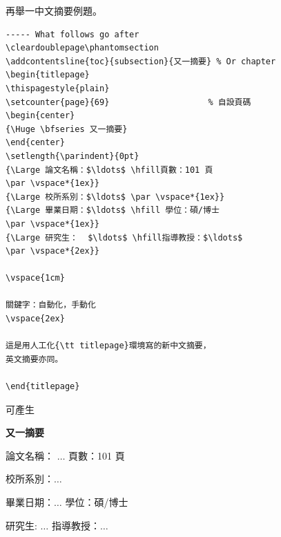 \begin{appendB}
再舉一中文摘要例題。

\begin{Verbatim}[frame=single,firstline=1,lastline=30,rulecolor=\color{red},label=Another abstract]
----- What follows go after 
\cleardoublepage\phantomsection
\addcontentsline{toc}{subsection}{又一摘要} % Or chapter
\begin{titlepage}
\thispagestyle{plain}
\setcounter{page}{69}                    % 自設頁碼
\begin{center}
{\Huge \bfseries 又一摘要}
\end{center}
\setlength{\parindent}{0pt}
{\Large 論文名稱：$\ldots$ \hfill頁數：101 頁
\par \vspace*{1ex}}
{\Large 校所系別：$\ldots$ \par \vspace*{1ex}}
{\Large 畢業日期：$\ldots$ \hfill 學位：碩/博士 
\par \vspace*{1ex}}
{\Large 研究生：  $\ldots$ \hfill指導教授：$\ldots$ 
\par \vspace*{2ex}}

\vspace{1cm}

關鍵字：自動化，手動化
\vspace{2ex}

這是用人工化{\tt titlepage}環境寫的新中文摘要，
英文摘要亦同。

\end{titlepage}
\end{Verbatim}

可產生

\cleardoublepage{}
{}  %
\begin{titlepage}
\thispagestyle{plain}
\setcounter{page}{69}                                %
\begin{center}
{\Huge \bfseries 又一摘要}
\end{center}
\setlength{\parindent}{0pt}
{\Large 論文名稱$：$ $\ldots$ \hfill 頁數$：$101 頁
\par \vspace*{1ex}}
{\Large 校所系別：$\ldots$ \par \vspace*{1ex}}
{\Large 畢業日期：$\ldots$ \hfill 學位：碩/博士 \par \vspace*{1ex}}
{\Large 研究生:  $\ldots$ \hfill 指導教授：$\ldots$ \par \vspace*{2ex}}


\end{titlepage}
\end{appendB}
